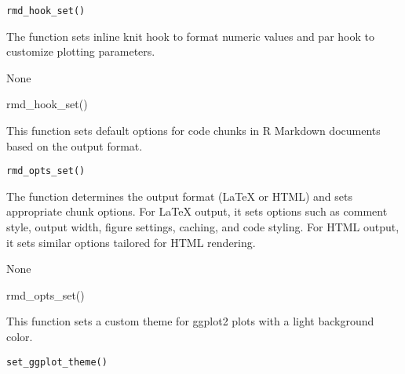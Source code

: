 \documentclass[a4paper]{book}
\begin{document}
%
\begin{Usage}
\begin{verbatim}
rmd_hook_set()
\end{verbatim}
\end{Usage}
%
\begin{Details}
The function sets inline knit hook to format numeric values and par hook to customize plotting parameters.
\end{Details}
%
\begin{Value}
None
\end{Value}
%
\begin{Examples}
\begin{ExampleCode}
rmd_hook_set()

\end{ExampleCode}
\end{Examples}
%
\begin{Description}
This function sets default options for code chunks in R Markdown documents based on the output format.
\end{Description}
%
\begin{Usage}
\begin{verbatim}
rmd_opts_set()
\end{verbatim}
\end{Usage}
%
\begin{Details}
The function determines the output format (LaTeX or HTML) and sets appropriate chunk options.
For LaTeX output, it sets options such as comment style, output width, figure settings, caching,
and code styling. For HTML output, it sets similar options tailored for HTML rendering.
\end{Details}
%
\begin{Value}
None
\end{Value}
%
\begin{Examples}
\begin{ExampleCode}
rmd_opts_set()

\end{ExampleCode}
\end{Examples}
%
\begin{Description}
This function sets a custom theme for ggplot2 plots with a light background color.
\end{Description}
%
\begin{Usage}
\begin{verbatim}
set_ggplot_theme()
\end{verbatim}
\end{Usage}
\end{document}
